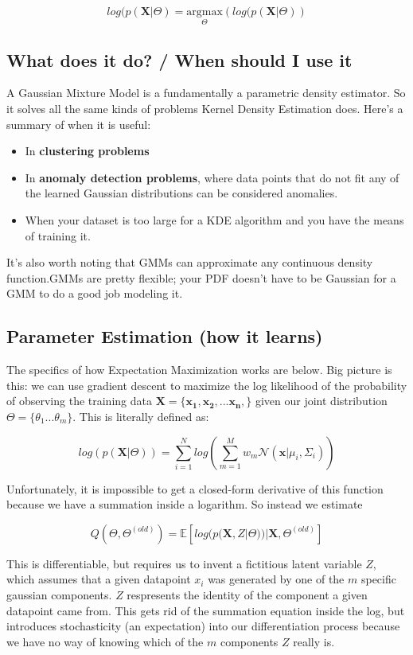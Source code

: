 \documentclass[12pt]{article}
\begin{document}
\[log(p(\mathbf{X} | \Theta) =\underset{\Theta}{\text{argmax}}\left(log(p(\mathbf{X} | \Theta)\right)\]

\subsection{What does it do? / When should I use it}

A Gaussian Mixture Model is a fundamentally a parametric density estimator. So it solves all the same kinds of problems Kernel Density Estimation does.
Here's a summary of when it is useful:

\begin{itemize}
    \item In \textbf{clustering problems}
    \item In \textbf{anomaly detection problems}, where data points that do not fit any of the learned Gaussian distributions can be considered anomalies.
    \item When your dataset is too large for a KDE algorithm and you have the means of training it. 
\end{itemize}

It's also worth noting that GMMs can approximate any continuous density function.GMMs are pretty flexible; your PDF doesn't have to be Gaussian for a GMM to do a good job modeling it.

\subsection{Parameter Estimation (how it learns)}

The specifics of how Expectation Maximization works are below. Big picture is this: we can use gradient descent to maximize the log likelihood  of the probability of observing the training data \(\mathbf{X} = \{\mathbf{x_1}, \mathbf{x_2}, ... \mathbf{x_n},\}\) given our joint distribution \(\Theta = \{\theta_1 ... \theta_m\}\). This is literally defined as:

\[log(p(\mathbf{X} | \Theta)) = \sum_{i=1}^N log\left( \sum_{m=1}^M w_m \mathcal{N}(\mathbf{x}|\mu_i, \Sigma_i) \right)\]

Unfortunately, it is impossible to get a closed-form derivative of this function because we have a summation inside a logarithm. So instead we estimate

\[Q(\Theta, \Theta^{(old)}) = \mathbb{E}\left[log(p(\mathbf{X}, Z | \Theta)) | \mathbf{X}, \Theta^{(old)}\right]\]

This is differentiable, but requires us to invent a fictitious latent variable \(Z\), which assumes that a given datapoint \(x_i\) was generated by one of the \(m\) specific gaussian components. \(Z\) respresents the identity of the component a given datapoint came from. This gets rid of the summation equation inside the log, but introduces stochasticity (an expectation) into our differentiation process because we have no way of knowing which of the \(m\) components \(Z\) really is. 
\end{document}
